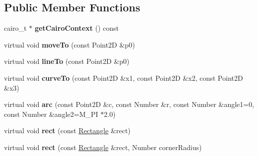 \subsection*{Public Member Functions}
\begin{DoxyCompactItemize}
\item 
\hypertarget{classsambag_1_1disco_1_1_cairo_draw_context_a2cee718c80145774ab4f7961060b5448}{
cairo\_\-t $\ast$ {\bfseries getCairoContext} () const }
\label{classsambag_1_1disco_1_1_cairo_draw_context_a2cee718c80145774ab4f7961060b5448}

\item 
\hypertarget{classsambag_1_1disco_1_1_cairo_draw_context_a1115169b1e734c5d78b8712edfbd963a}{
virtual void {\bfseries moveTo} (const Point2D \&p0)}
\label{classsambag_1_1disco_1_1_cairo_draw_context_a1115169b1e734c5d78b8712edfbd963a}

\item 
\hypertarget{classsambag_1_1disco_1_1_cairo_draw_context_af621fb2525f19011ad6a5b6173da9fa4}{
virtual void {\bfseries lineTo} (const Point2D \&p0)}
\label{classsambag_1_1disco_1_1_cairo_draw_context_af621fb2525f19011ad6a5b6173da9fa4}

\item 
\hypertarget{classsambag_1_1disco_1_1_cairo_draw_context_a4cf3f69ebb2dc2186d6ccbb45553d59b}{
virtual void {\bfseries curveTo} (const Point2D \&x1, const Point2D \&x2, const Point2D \&x3)}
\label{classsambag_1_1disco_1_1_cairo_draw_context_a4cf3f69ebb2dc2186d6ccbb45553d59b}

\item 
\hypertarget{classsambag_1_1disco_1_1_cairo_draw_context_a28aa2bd5f5032114716f8062bfd7446a}{
virtual void {\bfseries arc} (const Point2D \&c, const Number \&r, const Number \&angle1=0, const Number \&angle2=M\_\-PI $\ast$2.0)}
\label{classsambag_1_1disco_1_1_cairo_draw_context_a28aa2bd5f5032114716f8062bfd7446a}

\item 
\hypertarget{classsambag_1_1disco_1_1_cairo_draw_context_a3361d581f01a4fbca5afde6ee2d27183}{
virtual void {\bfseries rect} (const \hyperlink{classsambag_1_1com_1_1_rectangle}{Rectangle} \&rect)}
\label{classsambag_1_1disco_1_1_cairo_draw_context_a3361d581f01a4fbca5afde6ee2d27183}

\item 
\hypertarget{classsambag_1_1disco_1_1_cairo_draw_context_a1ef4af971a386d1b8292b24f1b6319ca}{
virtual void {\bfseries rect} (const \hyperlink{classsambag_1_1com_1_1_rectangle}{Rectangle} \&rect, Number cornerRadius)}
\label{classsambag_1_1disco_1_1_cairo_draw_context_a1ef4af971a386d1b8292b24f1b6319ca}


\end{DoxyCompactItemize}
